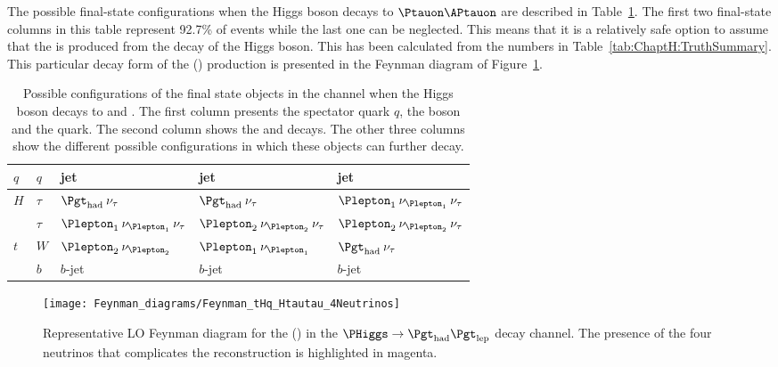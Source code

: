 The possible final-state configurations when the Higgs boson decays to $\Ptauon \APtauon$ are described in Table~\ref{tab:ChaptH:Reconstruction:Configurations}.
The first two final-state columns in this table represent 92.7\% of \Htautau events 
while the last one can be neglected. This means that it is a relatively safe option to assume that
the \tauhad is produced from the decay of the Higgs boson.
This has been calculated from the numbers in Table~\ref{tab:ChaptH:TruthSummary}.
This particular decay form of the \tHq(\dileptau) production is presented in the Feynman diagram of
Figure~\ref{fig:tHq:TruthFeyman}. 


\begin{table}[h]
\centering
\begin{tabular}{l|l|l|l|l}
\toprule
 $q$ & $q$ & jet & jet & jet \\ \midrule
 $H$ & $\tau$ & $\tauhad \: \nu_{\tau}$           &  $\tauhad \: \nu_{\tau}$           & $\Plepton_1 \: \nu_{\Plepton_1} \: \nu_{\tau}$ \\ 
     & $\tau$ & $\Plepton_1 \: \nu_{\Plepton_1} \: \nu_{\tau}$ &  $\Plepton_2 \: \nu_{\Plepton_2} \: \nu_{\tau}$ & $\Plepton_2 \: \nu_{\Plepton_2} \: \nu_{\tau}$ \\ \midrule
 $t$ &  $W$   & $\Plepton_2 \: \nu_{\Plepton_2}$               &  $\Plepton_1 \: \nu_{\Plepton_1}$               &  $\tauhad \: \nu_{\tau}$          \\ %
     &  $b$   &  $b$-jet                         &  $b$-jet                          & $b$-jet                          \\ \bottomrule
\end{tabular}
\caption{Possible configurations of the final state objects in the \dileptau channel when the Higgs boson decays
to \tauhad and \taulep. The first column presents the spectator quark $q$, the \PHiggs boson and the \Ptop quark.
The second column shows the \PHiggs and \Ptop decays. The other three columns show the different possible configurations in 
which these objects can further decay.}
\label{tab:ChaptH:Reconstruction:Configurations}
\end{table}


\begin{figure}[h]
\centering
\texttt{[image: Feynman\_diagrams/Feynman\_tHq\_Htautau\_4Neutrinos]}
\caption{Representative LO Feynman diagram for the \tHq (\dileptau) in 
the $\PHiggs \rightarrow \tauhad \taulep$ decay channel. The presence of the four neutrinos 
that complicates the reconstruction is 
highlighted in magenta.}
\label{fig:tHq:TruthFeyman}
\end{figure}

